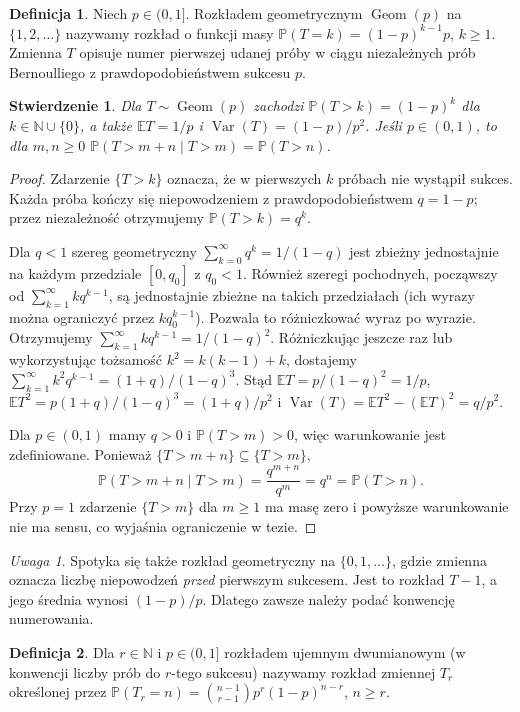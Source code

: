 \documentclass[11pt,a4paper,oneside]{report}
\numberwithin{equation}{chapter}
\theoremstyle{plain}
\newtheorem{stwierdzenie}[twierdzenie]{Stwierdzenie}
\theoremstyle{definition}
\newtheorem{definicja}{Definicja}[chapter]
\theoremstyle{remark}
\newtheorem{uwaga}{Uwaga}[chapter]
\newcommand{\N}{\mathbb{N}}
\newcommand{\Prob}{\mathbb{P}}
\newcommand{\E}{\mathbb{E}}
\newcommand{\Var}{\operatorname{Var}}
\newcommand{\Geom}{\operatorname{Geom}}
\begin{document}
\begin{definicja}
Niech $p\in(0,1]$. Rozkładem geometrycznym $\Geom(p)$
na $\{1,2,\ldots\}$ nazywamy rozkład o funkcji masy
$\Prob(T=k)=(1-p)^{k-1}p$, $k\geq1$.
Zmienna $T$ opisuje numer pierwszej udanej próby
w ciągu niezależnych prób Bernoulliego z prawdopodobieństwem sukcesu $p$.
\end{definicja}

\begin{stwierdzenie}
Dla $T\sim\Geom(p)$ zachodzi $\Prob(T>k)=(1-p)^k$ dla
$k\in\N\cup\{0\}$, a także
$\E T=1/p$ i $\Var(T)=(1-p)/p^2$.
Jeśli $p\in(0,1)$, to dla $m,n\geq0$
$\Prob(T>m+n\mid T>m)=\Prob(T>n)$.
\end{stwierdzenie}
\begin{proof}
Zdarzenie $\{T>k\}$ oznacza, że w pierwszych $k$
próbach nie wystąpił sukces. Każda próba kończy się
niepowodzeniem z prawdopodobieństwem $q=1-p$;
przez niezależność otrzymujemy
$\Prob(T>k)=q^k$.

Dla $q<1$ szereg geometryczny
$\sum_{k=0}^\infty q^k=1/(1-q)$ jest zbieżny
jednostajnie na każdym przedziale $[0,q_0]$ z $q_0<1$.
Również szeregi pochodnych, począwszy od
$\sum_{k=1}^\infty kq^{k-1}$, są jednostajnie zbieżne
na takich przedziałach (ich wyrazy można ograniczyć przez
$kq_0^{k-1}$). Pozwala to różniczkować wyraz po wyrazie.
Otrzymujemy
$\sum_{k=1}^\infty kq^{k-1}=1/(1-q)^2$.
Różniczkując jeszcze raz lub wykorzystując tożsamość
$k^2=k(k-1)+k$, dostajemy
$\sum_{k=1}^\infty k^2q^{k-1}=(1+q)/(1-q)^3$.
Stąd
$\E T=p/(1-q)^2=1/p$,
$\E T^2=p(1+q)/(1-q)^3=(1+q)/p^2$
i $\Var(T)=\E T^2-(\E T)^2=q/p^2$.

Dla $p\in(0,1)$ mamy $q>0$ i
$\Prob(T>m)>0$, więc warunkowanie jest zdefiniowane.
Ponieważ $\{T>m+n\}\subseteq\{T>m\}$,
\[
\Prob(T>m+n\mid T>m)
=\frac{q^{m+n}}{q^m}=q^n=\Prob(T>n).
\]
Przy $p=1$ zdarzenie $\{T>m\}$ dla $m\geq1$
ma masę zero i powyższe warunkowanie nie ma sensu,
co wyjaśnia ograniczenie w tezie.
\end{proof}

\begin{uwaga}
Spotyka się także rozkład geometryczny na $\{0,1,\ldots\}$,
gdzie zmienna oznacza liczbę niepowodzeń \emph{przed} pierwszym sukcesem.
Jest to rozkład $T-1$, a jego średnia wynosi $(1-p)/p$.
Dlatego zawsze należy podać konwencję numerowania.
\end{uwaga}

\begin{definicja}
Dla $r\in\N$ i $p\in(0,1]$ rozkładem ujemnym dwumianowym
(w konwencji liczby prób do $r$-tego sukcesu) nazywamy rozkład
zmiennej $T_r$ określonej przez
$\Prob(T_r=n)=\binom{n-1}{r-1}p^r(1-p)^{n-r}$, $n\geq r$.
\end{definicja}
\end{document}
